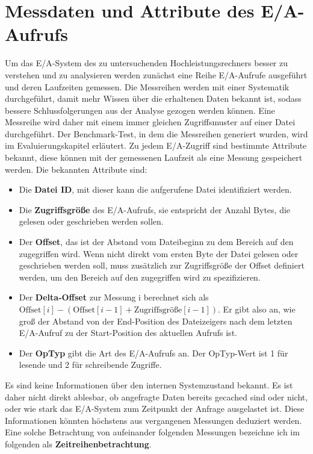 \documentclass[
	twoside,
	12pt,
	a4paper,
	BCOR10mm,
	DIV14,
	listof=totoc,
	bibliography=totoc,
	headsepline
]{scrreprt}
\begin{document}
\section{Messdaten und Attribute des E/A-Aufrufs}
\label{analyse:mess+att}
Um das E/A-System des zu untersuchenden Hochleistungsrechners besser zu verstehen und zu analysieren werden zunächst eine Reihe E/A-Aufrufe ausgeführt und deren Laufzeiten gemessen. Die Messreihen werden mit einer Systematik durchgeführt, damit mehr Wissen über die erhaltenen Daten bekannt ist, sodass bessere Schlussfolgerungen aus der Analyse gezogen werden können.
Eine Messreihe wird daher mit einem immer gleichen Zugriffsmuster auf einer Datei durchgeführt.
Der Benchmark-Test, in dem die Messreihen generiert wurden, wird im Evaluierungskapitel erläutert.
Zu jedem E/A-Zugriff sind bestimmte Attribute bekannt, diese können mit der gemessenen Laufzeit als eine Messung gespeichert werden.
Die bekannten Attribute sind:
\begin{itemize}
	\item Die \textbf{Datei ID}, mit dieser kann die aufgerufene Datei identifiziert werden.
	\item Die \textbf{Zugriffsgröße} des E/A-Aufrufs, sie entspricht der Anzahl Bytes, die gelesen oder geschrieben werden sollen. 
	\item Der \textbf{Offset}, das ist der Abstand vom Dateibeginn zu dem Bereich auf den zugegriffen wird. Wenn nicht direkt vom ersten Byte der Datei gelesen oder geschrieben werden soll, muss zusätzlich zur Zugriffsgröße der Offset definiert werden, um den Bereich auf den zugegriffen wird zu spezifizieren.
	\item Der \textbf{Delta-Offset} zur Messung i berechnet sich als $\mbox{Offset}[i] - (\mbox{Offset}[i-1] + \mbox{Zugriffsgröße}[i-1])$. Er gibt also an, wie groß der Abstand von der End-Position des Dateizeigers nach dem letzten E/A-Aufruf zu der Start-Position des aktuellen Aufrufs ist.
	\item Der \textbf{OpTyp} gibt die Art des E/A-Aufrufs an. Der OpTyp-Wert ist 1 für lesende und 2 für schreibende Zugriffe.
\end{itemize}
Es sind keine Informationen über den internen Systemzustand bekannt. Es ist daher nicht direkt ablesbar, ob angefragte Daten bereits gecached sind oder nicht, oder wie stark das E/A-System zum Zeitpunkt der Anfrage ausgelastet ist.
Diese Informationen könnten höchstens aus vergangenen Messungen deduziert werden. Eine solche Betrachtung von aufeinander folgenden Messungen bezeichne ich im folgenden als \textbf{Zeitreihenbetrachtung}.
\end{document}
